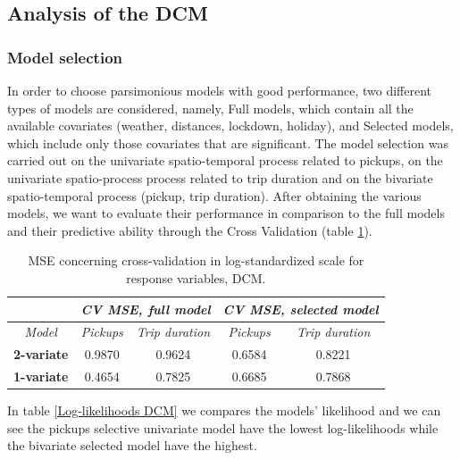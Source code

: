 \subsection{Analysis of the DCM}

\subsubsection{Model selection}
In order to choose  parsimonious models with good performance, two different types of models are considered, namely, Full models, which contain all the available covariates (weather, distances, lockdown, holiday), and Selected models, which include only those covariates that are significant. The model selection was carried out on the univariate spatio-temporal process related to pickups, on the univariate spatio-process process related to trip duration and on the bivariate spatio-temporal process (pickup, trip duration). After obtaining the various models, we want to evaluate their performance in comparison to the full models and their predictive ability through the Cross Validation (table \ref{Cross-validation mean squared errors DCM}).

\begin{table}
	\centering
	\renewcommand\arraystretch{1.3}
	\begin{tabular}{c|cc|cc}
		\hline
		\multicolumn{1}{l|}{} & \multicolumn{2}{c|}{\textit{CV MSE, full model}} & \multicolumn{2}{c}{\textit{CV MSE, selected model} }\\ 
		\hline
		\textit{Model} & \multicolumn{1}{c|}{\textit{Pickups}} & \textit{Trip duration} & \multicolumn{1}{c|}{\textit{Pickups}} & \textit{Trip duration} \\ 
		\hline
		\textbf{2-variate } & \multicolumn{1}{c|}{0.9870}  & 0.9624   & \multicolumn{1}{c|}{0.6584}  & 0.8221   \\ 
		\hline
		\textbf{1-variate } & \multicolumn{1}{c|}{0.4654}  & 0.7825   & \multicolumn{1}{c|}{0.6685}  & 0.7868   \\ 
		\hline
	\end{tabular}
	\caption[MSE concerning cross-validation in log-standardized scale for response variables (DCM)]{MSE concerning cross-validation in log-standardized scale for response variables, DCM.}
	\label{Cross-validation mean squared errors DCM}
\end{table}

\noindent
In table \ref{Log-likelihoods DCM} we compares the models' likelihood and we can see the pickups selective univariate model have the lowest log-likelihoods while the bivariate selected model have the highest.

